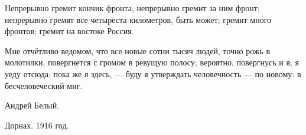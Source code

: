 \documentclass[12pt,a4paper,oneside]{book}
\begin{document}
Непрерывно гремит кончик фронта; непрерывно гремит за ним фронт; непрерывно гремят все четыреста километров, быть может; гремит много фронтов; гремит на востоке Россия.

Мне отчётливо ведомом, что все новые сотни тысяч людей, точно рожь в молотилки, повергнется с громом в ревущую полосу; вероятно, повергнусь и я; я уеду отсюда; пока же я здесь, — буду я утверждать человечность — по новому: в бесчеловеческий миг.

\begin{flushright}Андрей Белый.

Дорнах. 1916 год.\end{flushright}
\end{document}
